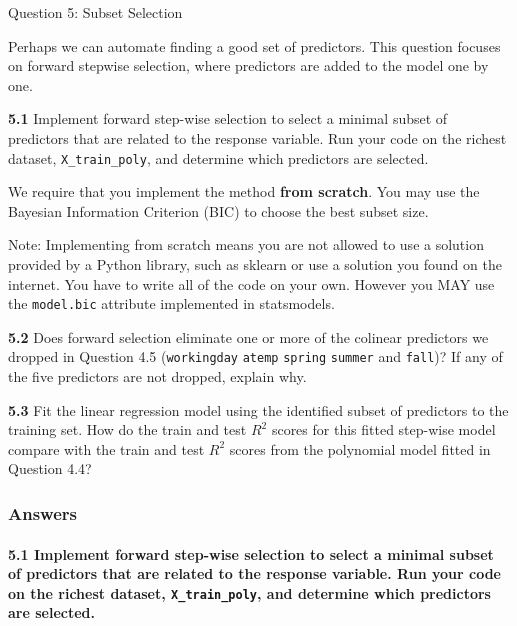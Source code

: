 \documentclass[11pt]{article}
\begin{document}
     Question 5: Subset Selection

Perhaps we can automate finding a good set of predictors. This question
focuses on forward stepwise selection, where predictors are added to the
model one by one.

\textbf{5.1} Implement forward step-wise selection to select a minimal
subset of predictors that are related to the response variable. Run your
code on the richest dataset, \texttt{X\_train\_poly}, and determine
which predictors are selected.

We require that you implement the method \textbf{from scratch}. You may
use the Bayesian Information Criterion (BIC) to choose the best subset
size.

Note: Implementing from scratch means you are not allowed to use a
solution provided by a Python library, such as sklearn or use a solution
you found on the internet. You have to write all of the code on your
own. However you MAY use the \texttt{model.bic} attribute implemented in
statsmodels.

\textbf{5.2} Does forward selection eliminate one or more of the
colinear predictors we dropped in Question 4.5 (\texttt{workingday}
\texttt{atemp} \texttt{spring} \texttt{summer} and \texttt{fall})? If
any of the five predictors are not dropped, explain why.

\textbf{5.3} Fit the linear regression model using the identified subset
of predictors to the training set. How do the train and test \(R^2\)
scores for this fitted step-wise model compare with the train and test
\(R^2\) scores from the polynomial model fitted in Question 4.4?

    \subsubsection{Answers}\label{answers}

    \paragraph{\texorpdfstring{\textbf{5.1} Implement forward step-wise
selection to select a minimal subset of predictors that are related to
the response variable. Run your code on the richest dataset,
\texttt{X\_train\_poly}, and determine which predictors are
selected.}{5.1 Implement forward step-wise selection to select a minimal subset of predictors that are related to the response variable. Run your code on the richest dataset, X\_train\_poly, and determine which predictors are selected.}}\label{implement-forward-step-wise-selection-to-select-a-minimal-subset-of-predictors-that-are-related-to-the-response-variable.-run-your-code-on-the-richest-dataset-x_train_poly-and-determine-which-predictors-are-selected.}
\end{document}
